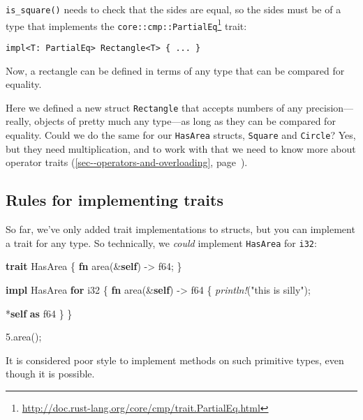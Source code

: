 \documentclass[a4paper,]{book}
\renewcommand*{\hyperref}[2][\ar]{%
  \def\ar{#2}%
  #2 (\autoref{#1}, page~\pageref{#1})}
\newenvironment{Shaded}{\begin{snugshade}}{\end{snugshade}}
\newcommand{\KeywordTok}[1]{\textcolor[rgb]{0.13,0.29,0.53}{\textbf{{#1}}}}
\newcommand{\DataTypeTok}[1]{\textcolor[rgb]{0.13,0.29,0.53}{{#1}}}
\newcommand{\DecValTok}[1]{\textcolor[rgb]{0.00,0.00,0.81}{{#1}}}
\newcommand{\StringTok}[1]{\textcolor[rgb]{0.31,0.60,0.02}{{#1}}}
\newcommand{\PreprocessorTok}[1]{\textcolor[rgb]{0.56,0.35,0.01}{\textit{{#1}}}}
\newcommand{\NormalTok}[1]{{#1}}
\renewcommand{\href}[2]{#2\footnote{\url{#1}}}
\begin{document}
\texttt{is\_square()} needs to check that the sides are equal, so the
sides must be of a type that implements the
\href{http://doc.rust-lang.org/core/cmp/trait.PartialEq.html}{\texttt{core::cmp::PartialEq}}
trait:

\begin{verbatim}
impl<T: PartialEq> Rectangle<T> { ... }
\end{verbatim}

Now, a rectangle can be defined in terms of any type that can be
compared for equality.

Here we defined a new struct \texttt{Rectangle} that accepts numbers of
any precision---really, objects of pretty much any type---as long as
they can be compared for equality. Could we do the same for our
\texttt{HasArea} structs, \texttt{Square} and \texttt{Circle}? Yes, but
they need multiplication, and to work with that we need to know more
about \hyperref[sec--operators-and-overloading]{operator traits}.

\subsection{Rules for implementing
traits}\label{rules-for-implementing-traits}

So far, we've only added trait implementations to structs, but you can
implement a trait for any type. So technically, we \emph{could}
implement \texttt{HasArea} for \texttt{i32}:

\begin{Shaded}
\begin{Highlighting}[]
\KeywordTok{trait} \NormalTok{HasArea \{}
    \KeywordTok{fn} \NormalTok{area(&}\KeywordTok{self}\NormalTok{) -> }\DataTypeTok{f64}\NormalTok{;}
\NormalTok{\}}

\KeywordTok{impl} \NormalTok{HasArea }\KeywordTok{for} \DataTypeTok{i32} \NormalTok{\{}
    \KeywordTok{fn} \NormalTok{area(&}\KeywordTok{self}\NormalTok{) -> }\DataTypeTok{f64} \NormalTok{\{}
        \PreprocessorTok{println!}\NormalTok{(}\StringTok{"this is silly"}\NormalTok{);}

        \NormalTok{*}\KeywordTok{self} \KeywordTok{as} \DataTypeTok{f64}
    \NormalTok{\}}
\NormalTok{\}}

\DecValTok{5.}\NormalTok{area();}
\end{Highlighting}
\end{Shaded}

It is considered poor style to implement methods on such primitive
types, even though it is possible.
\end{document}
